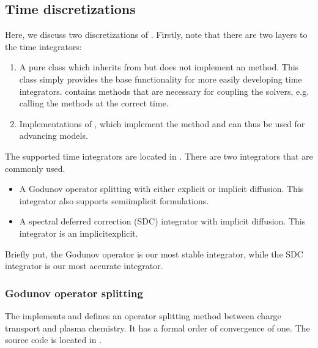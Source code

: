 \documentclass[letterpaper,10pt,english]{sphinxmanual}
\begin{document}
\subsection{Time discretizations}
\label{\detokenize{Applications/CdrPlasmaModel:time-discretizations}}
\sphinxAtStartPar
Here, we discuss two discretizations of .
Firstly, note that there are two layers to the time integrators:
\begin{enumerate}
%
\item {} 
\sphinxAtStartPar
A pure class  which inherits from  but does not implement an  method.
This class simply provides the base functionality for more easily developing time integrators.
 contains methods that are necessary for coupling the solvers, e.g. calling the  methods at the correct time.

\item {} 
\sphinxAtStartPar
Implementations of , which implement the  method and can thus be used for advancing models.

\end{enumerate}

\sphinxAtStartPar
The supported time integrators are located in .
There are two integrators that are commonly used.
\begin{itemize}
\item {} 
\sphinxAtStartPar
A Godunov operator splitting with either explicit or implicit diffusion.
This integrator also supports semi\sphinxhyphen{}implicit formulations.

\item {} 
\sphinxAtStartPar
A spectral deferred correction (SDC) integrator with implicit diffusion.
This integrator is an implicit\sphinxhyphen{}explicit.

\end{itemize}

\sphinxAtStartPar
Briefly put, the Godunov operator is our most stable integrator, while the SDC integrator is our most accurate integrator.


\subsubsection{Godunov operator splitting}
\label{\detokenize{Applications/CdrPlasmaModel:godunov-operator-splitting}}\label{\detokenize{Applications/CdrPlasmaModel:chap-godunov}}
\sphinxAtStartPar
The  implements  and defines an operator splitting method between charge transport and plasma chemistry.
It has a formal order of convergence of one.
The source code is located in .
\end{document}
